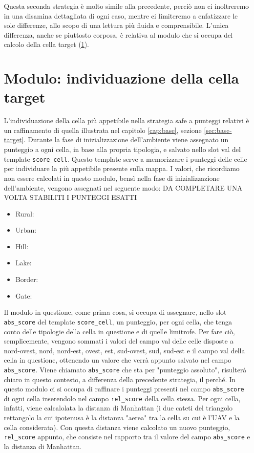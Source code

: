 Questa seconda strategia è molto simile alla precedente, perciò non ci inoltreremo in una disamina dettagliata di ogni caso, mentre ci limiteremo a enfatizzare le sole differenze, allo scopo di una lettura più fluida e comprensibile. L'unica differenza, anche se piuttosto corposa, è relativa al modulo che si occupa del calcolo della cella target (\ref{sec:safe-target}).

\section{Modulo: individuazione della cella target} \label{sec:safe-target}
L'individuazione della cella più appetibile nella strategia safe a punteggi relativi è un raffinamento di quella illustrata nel capitolo \ref{cap:base}, sezione \ref{sec:base-target}. Durante la fase di inizializzazione dell'ambiente viene assegnato un punteggio a ogni cella, in base alla propria tipologia, e salvato nello slot val del template \texttt{score\_cell}. Questo template serve a memorizzare i punteggi delle celle per individuare la più appetibile presente sulla mappa. I valori, che ricordiamo non essere calcolati in questo modulo, bensì nella fase di inizializzazione dell'ambiente, vengono assegnati nel seguente modo: {\color{red}DA COMPLETARE UNA VOLTA STABILITI I PUNTEGGI ESATTI}
\begin{itemize}
	\item Rural: 
	\item Urban: 
	\item Hill: 
	\item Lake: 
	\item Border: 
	\item Gate: 	
\end{itemize}
Il modulo in questione, come prima cosa, si occupa di assegnare, nello slot \texttt{abs\_score} del template \texttt{score\_cell}, un punteggio, per ogni cella, che tenga conto delle tipologie della cella in questione e di quelle limitrofe. Per fare ciò, semplicemente, vengono sommati i valori del campo val delle celle disposte a nord-ovest, nord, nord-est, ovest, est, sud-ovest, sud, sud-est e il campo val della cella in questione, ottenendo un valore che verrà appunto salvato nel campo \texttt{abs\_score}. Viene chiamato \texttt{abs\_score} che sta per "punteggio assoluto", risulterà chiaro in questo contesto, a differenza della precedente strategia, il perché.
In questo modulo ci si occupa di raffinare i punteggi presenti nel campo \texttt{abs\_score} di ogni cella inserendolo nel campo \texttt{rel\_score} della cella stessa. Per ogni cella, infatti, viene calcalolata la distanza di Manhattan (i due cateti del triangolo rettangolo la cui ipotenusa è la distanza "aerea" tra la cella su cui è l'UAV e la cella considerata). Con questa distanza viene calcolato un nuovo punteggio, \texttt{rel\_score} appunto, che consiste nel rapporto tra il valore del campo \texttt{abs\_score} e la distanza di Manhattan.
